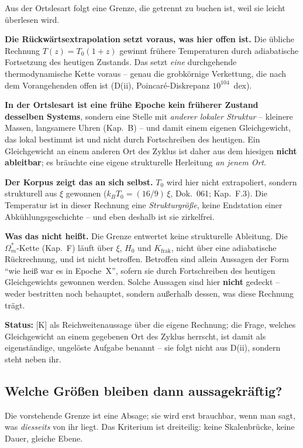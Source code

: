 \documentclass[11pt]{report}
\begin{document}
Aus der Ortslesart folgt eine Grenze, die getrennt zu buchen ist,
weil sie leicht überlesen wird.

\textbf{Die Rückwärtsextrapolation setzt voraus, was hier offen
ist.} Die übliche Rechnung $T(z) = T_0(1+z)$ gewinnt frühere
Temperaturen durch adiabatische Fortsetzung des heutigen
Zustands. Das setzt \emph{eine} durchgehende thermodynamische
Kette voraus -- genau die grobkörnige Verkettung, die nach dem
Vorangehenden offen ist (D(ii), Poincaré-Diskrepanz
$10^{104}$~dex).

\textbf{In der Ortslesart ist eine frühe Epoche kein früherer
Zustand desselben Systems}, sondern eine Stelle mit \emph{anderer
lokaler Struktur} -- kleinere Massen, langsamere Uhren (Kap.~B) --
und damit einem eigenen Gleichgewicht, das lokal bestimmt ist und
nicht durch Fortschreiben des heutigen. Ein Gleichgewicht an
einem anderen Ort des Zyklus ist daher aus dem hiesigen
\textbf{nicht ableitbar}; es bräuchte eine eigene strukturelle
Herleitung \emph{an jenem Ort}.

\textbf{Der Korpus zeigt das an sich selbst.} $T_0$ wird hier
nicht extrapoliert, sondern strukturell aus $\xi$ gewonnen
($k_BT_0 = (16/9)\,\xi$, Dok.~061; Kap.~F.3). Die Temperatur ist
in dieser Rechnung eine \emph{Strukturgröße}, keine Endstation
einer Abkühlungsgeschichte -- und eben deshalb ist sie
zirkelfrei.

\textbf{Was das nicht heißt.} Die Grenze entwertet keine
strukturelle Ableitung. Die $\Omega_m^{*}$-Kette (Kap.~F) läuft
über $\xi$, $H_0$ und $K_\text{frak}$, nicht über eine
adiabatische Rückrechnung, und ist nicht betroffen. Betroffen
sind allein Aussagen der Form \enquote{wie heiß war es in
Epoche~X}, sofern sie durch Fortschreiben des heutigen
Gleichgewichts gewonnen werden. Solche Aussagen sind hier
\textbf{nicht} gedeckt -- weder bestritten noch behauptet,
sondern außerhalb dessen, was diese Rechnung trägt.

\textbf{Status:} [K] als Reichweitenaussage über die eigene
Rechnung; die Frage, welches Gleichgewicht an einem gegebenen Ort
des Zyklus herrscht, ist damit als eigenständige, ungelöste
Aufgabe benannt -- sie folgt nicht aus D(ii), sondern steht neben
ihr.

\subsection*{Welche Größen bleiben dann aussagekräftig?}

Die vorstehende Grenze ist eine Absage; sie wird erst brauchbar,
wenn man sagt, was \emph{diesseits} von ihr liegt. Das Kriterium
ist dreiteilig: keine Skalenbrücke, keine Dauer, gleiche Ebene.
\end{document}
